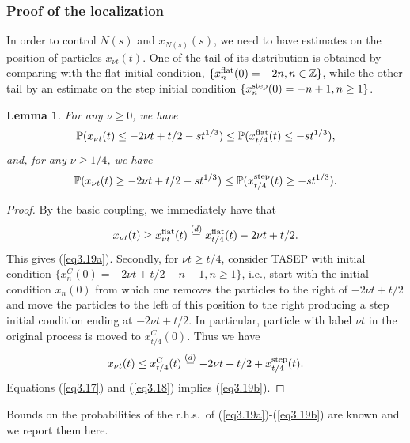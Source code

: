 \documentclass[12pt,a4paper]{article}
\numberwithin{equation}{section}
\newcommand{\Pb}{\mathbb{P}}
\newcommand{\Z}{\mathbb{Z}}
\newtheorem{lem}[prop]{Lemma}
\begin{document}
\subsubsection*{Proof of the localization}
In order to control $N(s)$ and $x_{N(s)}(s)$, we need to have estimates on the position of particles $x_{\nu t}(t)$. One of the tail of its distribution is obtained by comparing with the flat initial condition, $\{x^{\rm flat}_n(0)=-2n, n\in\Z\}$, while the other tail by an estimate on the step initial condition $\{x^{\rm step}_n(0)=-n+1,n\geq 1\}$.
\begin{lem}\label{lemBounds1}
For any $\nu\geq 0$, we have
\begin{equation}\label{eq3.19a}
\Pb(x_{\nu t}(t)\leq -2\nu t+t/2-s t^{1/3})\leq\Pb(x^{\rm flat}_{t/4}(t)\leq -s t^{1/3}),
\end{equation}
and, for any $\nu\geq 1/4$, we have
\begin{equation}\label{eq3.19b}
\Pb(x_{\nu t}(t)\geq -2\nu t+t/2-s t^{1/3})\leq \Pb(x^{\rm step}_{t/4}(t)\geq -s t^{1/3}).
\end{equation}
\end{lem}
\begin{proof}
By the basic coupling, we immediately have that
\begin{equation}\label{eq3.17}
x_{\nu t}(t) \geq x^{\rm flat}_{\nu t}(t) \stackrel{(d)}{=}x^{\rm flat}_{t/4}(t)-2\nu t+t/2.
\end{equation}
This gives (\ref{eq3.19a}). Secondly, for $\nu t\geq t/4$, consider TASEP with initial condition $\{x^{C}_n(0)=-2\nu t+t/2-n+1,n\geq 1\}$, i.e., start with the initial condition $x_n(0)$ from which one removes the particles to the right of $-2\nu t+ t/2$ and move the particles to the left of this position to the right producing a step initial condition ending at $-2\nu t+t/2$. In particular, particle with label $\nu t$ in the original process is moved to $x_{t/4}^C(0)$. Thus we have
\begin{equation}\label{eq3.18}
x_{\nu t}(t)\leq x^C_{t/4}(t) \stackrel{(d)}{=} -2\nu t+t/2+x^{\rm step}_{t/4}(t).
\end{equation}
Equations (\ref{eq3.17}) and (\ref{eq3.18}) implies (\ref{eq3.19b}).
\end{proof}
Bounds on the probabilities of the r.h.s.\ of (\ref{eq3.19a})-(\ref{eq3.19b}) are known and we report them here.
\end{document}
